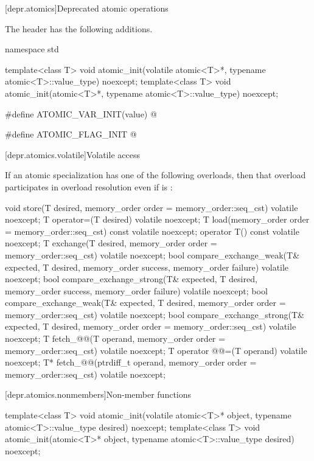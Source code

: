 [depr.atomics]{Deprecated atomic operations}

\pnum
The header  has the following additions.

\begin{codeblock}
namespace std {
  template<class T>
    void atomic_init(volatile atomic<T>*, typename atomic<T>::value_type) noexcept;
  template<class T>
    void atomic_init(atomic<T>*, typename atomic<T>::value_type) noexcept;

  #define ATOMIC_VAR_INIT(value) @\seebelow@

  #define ATOMIC_FLAG_INIT @\seebelow@
}
\end{codeblock}

[depr.atomics.volatile]{Volatile access}

If an atomic specialization has one of the following overloads,
then that overload participates in overload resolution
even if  is :
\begin{codeblock}
void store(T desired, memory_order order = memory_order::seq_cst) volatile noexcept;
T operator=(T desired) volatile noexcept;
T load(memory_order order = memory_order::seq_cst) const volatile noexcept;
operator T() const volatile noexcept;
T exchange(T desired, memory_order order = memory_order::seq_cst) volatile noexcept;
bool compare_exchange_weak(T& expected, T desired,
                           memory_order success, memory_order failure) volatile noexcept;
bool compare_exchange_strong(T& expected, T desired,
                             memory_order success, memory_order failure) volatile noexcept;
bool compare_exchange_weak(T& expected, T desired,
                           memory_order order = memory_order::seq_cst) volatile noexcept;
bool compare_exchange_strong(T& expected, T desired,
                             memory_order order = memory_order::seq_cst) volatile noexcept;
T fetch_@@(T operand, memory_order order = memory_order::seq_cst) volatile noexcept;
T operator @@=(T operand) volatile noexcept;
T* fetch_@@(ptrdiff_t operand, memory_order order = memory_order::seq_cst) volatile noexcept;
\end{codeblock}

[depr.atomics.nonmembers]{Non-member functions}

%
\begin{itemdecl}
template<class T>
  void atomic_init(volatile atomic<T>* object, typename atomic<T>::value_type desired) noexcept;
template<class T>
  void atomic_init(atomic<T>* object, typename atomic<T>::value_type desired) noexcept;
\end{itemdecl}

